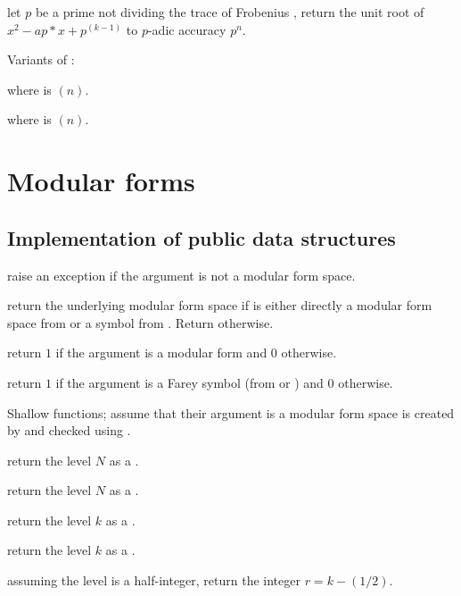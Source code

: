 let $p$ be a prime not dividing the trace of Frobenius ,
return the unit root of $x^2 - ap*x + p^(k-1)$ to $p$-adic accuracy $p^n$.

Variants of  :


 where  is $(n)$.

 where  is $(n)$.

\newpage

\chapter{Modular forms}

\section{Implementation of public data structures}

 raise an exception if the argument is not a
modular form space.

 return the underlying modular form space
if  is either directly a modular form space from 
or a symbol from . Return  otherwise.

 return $1$ if the argument is a modular form
and $0$ otherwise.

 return $1$ if the argument is a Farey symbol
(from  or ) and $0$ otherwise.


Shallow functions; assume that their argument is a modular form space
is created by  and checked using .

 return the level $N$ as a .

 return the level $N$ as a .

 return the level $k$ as a .

 return the level $k$ as a .

 assuming the level is a half-integer, return
the integer $r = k - (1/2)$.

